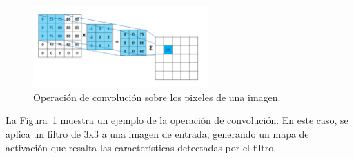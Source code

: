 \documentclass[11pt,spanish,listoffigures,listoftables]{tfgetsinf}
\begin{document}
\begin{figure}[H]
   \centering
   \includegraphics[width=0.6\textwidth]{images/estado_del_arte/operacion_convolucion.png}
   \caption{Operación de convolución sobre los pixeles de una imagen.}
   \label{fig:operacion_convolucion}
\end{figure}

La Figura~\ref{fig:operacion_convolucion} muestra un ejemplo de la operación de convolución. En este caso, se aplica un filtro de 3x3 a una imagen de entrada, generando un mapa de activación que resalta las características detectadas por el filtro.
\end{document}

